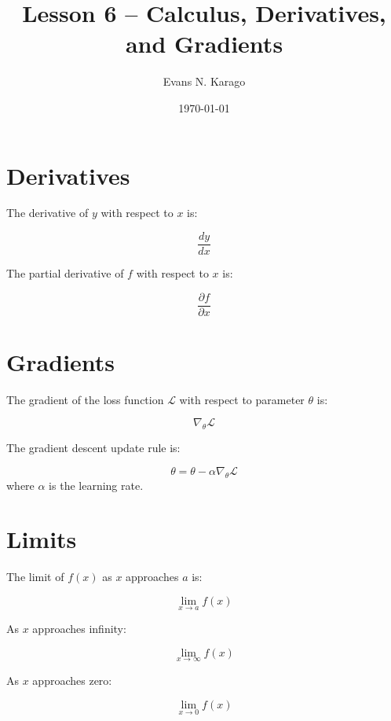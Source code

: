 \documentclass[11pt]{article}
\title{Lesson 6 -- Calculus, Derivatives, and Gradients}
\author{Evans N. Karago}
\date{\today}
\begin{document}
\maketitle
\section*{Derivatives}
The derivative of $y$ with respect to $x$ is:

\[
\frac{dy}{dx}
\]

The partial derivative of $f$ with respect to $x$ is:

\[
\frac{\partial f}{\partial x}
\]
\section*{Gradients}
The gradient of the loss function $\mathcal{L}$ with respect to parameter $\theta$ is:

\[
\nabla_{\theta}\mathcal{L}
\]

The gradient descent update rule is:

\[
\theta = \theta - \alpha\nabla_{\theta}\mathcal{L}
\]
where $\alpha$ is the learning rate.

\section*{Limits}
The limit of $f(x)$ as $x$ approaches $a$ is:

\[
\lim_{x \to a} f(x)
\]

As $x$ approaches infinity:

\[
\lim_{x \to \infty}f(x)
\]

As $x$ approaches zero:

\[
\lim_{x \to 0} f(x)
\]
\end{document}
